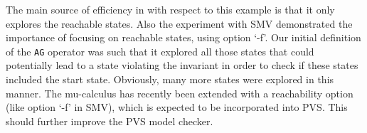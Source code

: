 The main    source of efficiency  in \Murphi{}   with respect  to this
example  is that it  only  explores  the  reachable states.  Also  the
experiment with SMV demonstrated     the importance of  focusing    on
reachable  states, using option  `-f'.  Our  initial definition of the
{\tt  AG}  operator was such  that  it explored  all those states that
could potentially lead to a state  violating the invariant in order to
check if these states included the  start state.  Obviously, many more
states     were  explored  in       this  manner.     The  mu-calculus
\cite{Jan:Mu-calculus} has recently  been extended with a reachability
option (like option `-f' in SMV), which is expected to be incorporated
into PVS.  This should further improve the PVS model checker.





